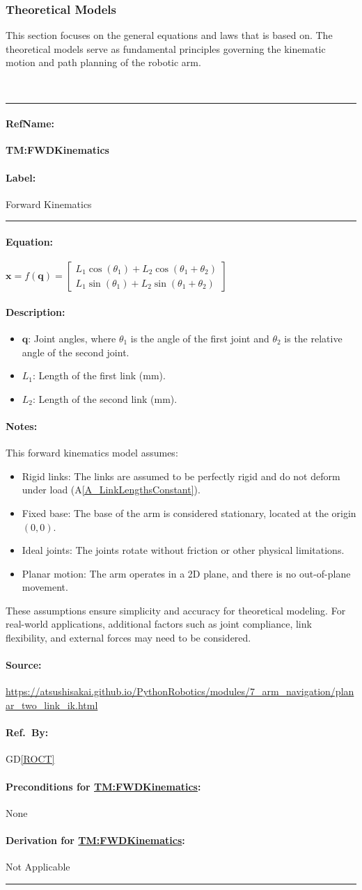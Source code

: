 \documentclass[12pt]{article}
\newcommand{\dref}[1]{GD\ref{#1}}
\newcommand{\aref}[1]{A\ref{#1}}
\newcommand{\deftheory}[9][Not Applicable]
{
\newpage
\noindent \rule{\textwidth}{0.5mm}

\paragraph{RefName: } \textbf{#2} \phantomsection 
\label{#2}

\paragraph{Label:} #3

\noindent \rule{\textwidth}{0.5mm}

\paragraph{Equation:}

#4

\paragraph{Description:}

#5

\paragraph{Notes:}

#6

\paragraph{Source:}

#7

\paragraph{Ref.\ By:}

#8

\paragraph{Preconditions for \hyperref[#2]{#2}:}
\label{#2_precond}

#9

\paragraph{Derivation for \hyperref[#2]{#2}:}
\label{#2_deriv}

#1

\noindent \rule{\textwidth}{0.5mm}

}
\begin{document}
\subsubsection{Theoretical Models}\label{sec_theoretical}

This section focuses on the general equations and laws that \progname{} is based
on. The theoretical models serve as fundamental principles governing the kinematic motion and path planning of the robotic arm. 

~\newline

\noindent
\deftheory
{TM:FWDKinematics}
{Forward Kinematics}
{
  $\mathbf{x} = f(\mathbf{q}) = \begin{bmatrix}
  L_1 \cos(\theta_1) + L_2 \cos(\theta_1 + \theta_2) \\
  L_1 \sin(\theta_1) + L_2 \sin(\theta_1 + \theta_2)
  \end{bmatrix}$
}
{
  \begin{itemize}
    \item $\mathbf{q}$: Joint angles, where $\theta_1$ is the angle of the first joint and $\theta_2$ is the relative angle of the second joint.
    \item $L_1$: Length of the first link (\si{\milli\metre}).
    \item $L_2$: Length of the second link (\si{\milli\metre}).
  \end{itemize}
}
{
  This forward kinematics model assumes:
  \begin{itemize}
    \item Rigid links: The links are assumed to be perfectly rigid and do not deform under load (\aref{A_LinkLengthsConstant}).
    \item Fixed base: The base of the arm is considered stationary, located at the origin $(0, 0)$.
    \item Ideal joints: The joints rotate without friction or other physical limitations.
    \item Planar motion: The arm operates in a 2D plane, and there is no out-of-plane movement.
  \end{itemize}

  These assumptions ensure simplicity and accuracy for theoretical modeling. For real-world applications, additional factors such as joint compliance, link flexibility, and external forces may need to be considered.
}
{
  \url{https://atsushisakai.github.io/PythonRobotics/modules/7_arm_navigation/planar_two_link_ik.html}
}
{
  \dref{ROCT}
}
{
None
}
{}
\end{document}
